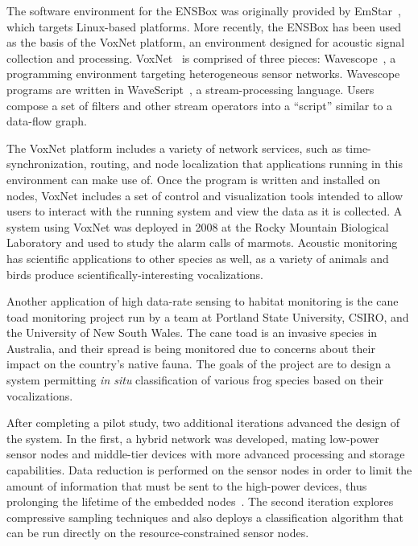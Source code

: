 The software environment for the ENSBox was originally provided by
EmStar~\cite{emstar}, which targets Linux-based platforms. More recently, the
ENSBox has been used as the basis of the VoxNet platform, an environment
designed for acoustic signal collection and processing.
VoxNet~\cite{voxnet-ipsn08} is comprised of three pieces:
Wavescope~\cite{wavescope}, a programming environment targeting
heterogeneous sensor networks. Wavescope programs are written in
WaveScript~\cite{wavescript-techreport08}, a stream-processing language.
Users compose a set of filters and other stream operators into a ``script''
similar to a data-flow graph.

The VoxNet platform includes a variety of network services, such as
time-synchronization, routing, and node localization that applications
running in this environment can make use of. Once the program is written and
installed on nodes, VoxNet includes a set of control and visualization tools
intended to allow users to interact with the running system and view the data
as it is collected. A system using VoxNet was deployed in 2008 at the Rocky
Mountain Biological Laboratory and used to study the alarm calls of marmots.
Acoustic monitoring has scientific applications to other species as well, as
a variety of animals and birds produce scientifically-interesting
vocalizations.

Another application of high data-rate sensing to habitat monitoring is the
cane toad monitoring project run by a team at Portland State University,
CSIRO, and the University of New South Wales. The cane toad is an invasive
species in Australia, and their spread is being monitored due to concerns
about their impact on the country's native fauna. The goals of the project
are to design a system permitting \textit{in situ} classification of various
frog species based on their vocalizations.

After completing a pilot study, two additional iterations advanced the design
of the system. In the first, a hybrid network was developed, mating low-power
sensor nodes and middle-tier devices with more advanced processing and
storage capabilities. Data reduction is performed on the sensor nodes in
order to limit the amount of information that must be sent to the high-power
devices, thus prolonging the lifetime of the embedded
nodes~\cite{canetoad-tosn}. The second iteration explores compressive
sampling techniques and also deploys a classification algorithm that can be
run directly on the resource-constrained sensor nodes.

